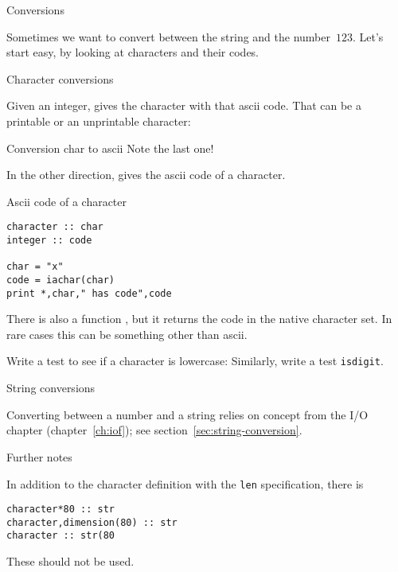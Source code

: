  {Conversions}

Sometimes we want to convert between the string  and the number~$123$.
Let's start easy, by looking at characters and their  codes.

 {Character conversions}
\label{sec:f-ascci-char}

Given an integer,  gives the character with that ascii code.
That can be a printable or an unprintable character:
\begin{block}{Conversion char to ascii}
  \label{sl:f-to-ascii}
  Note the last one!
\end{block}

In the other direction,  gives the ascii code of a character.
\begin{block}{Ascii code of a character}
  \label{sl:f-ascii-code}
\begin{lstlisting}
character :: char
integer :: code

char = "x"
code = iachar(char)
print *,char," has code",code  
\end{lstlisting}
\end{block}

\begin{remark}
  There is also a function , but it returns the code
  in the native character set. In rare cases this can be something
  other than ascii.
\end{remark}

\begin{exercise}
  \label{ex:f-test-lower}
  Write a test to see if a character is lowercase:
  Similarly, write a test \lstinline{isdigit}.
\end{exercise}

 {String conversions}

Converting between a number and a string relies on concept
from the  I/O chapter (chapter~\ref{ch:iof});
see section~\ref{sec:string-conversion}.

 {Further notes}

In addition to the character definition with the \lstinline{len} specification,
there is
\begin{lstlisting}
character*80 :: str
character,dimension(80) :: str
character :: str(80
\end{lstlisting}
These should not be used.
